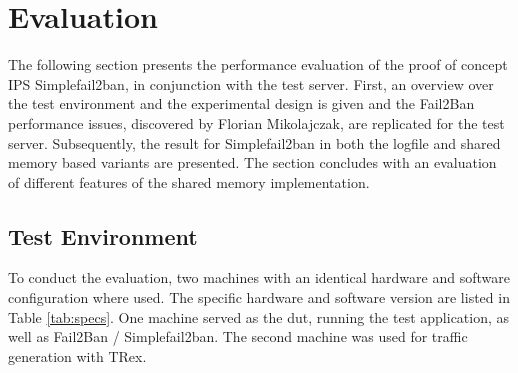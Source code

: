 
%

\chapter{Evaluation} \label{sec:evaluation}


The following section presents the performance evaluation of the proof of concept \ac{IPS} Simplefail2ban, in conjunction
with the test server. First, an overview over the test environment and the experimental design is given and the Fail2Ban performance
issues, discovered by Florian Mikolajczak, are replicated for the test server. Subsequently, the result for Simplefail2ban in both the logfile
and shared memory based variants are presented. The section concludes with an evaluation of different features of the shared memory implementation. 

\section{Test Environment}

To conduct the evaluation, two machines with an identical hardware and software configuration where used. The specific hardware and software version are listed in Table \ref{tab:specs}.
One machine served as the dut, running the test application, as well as Fail2Ban / Simplefail2ban. The second machine was used for traffic generation with TRex.  

